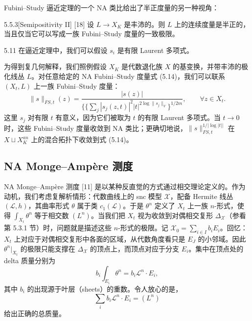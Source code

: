 Fubini--Study 逼近定理的一个 NA 类比给出了半正度量的另一种视角：

\begin{proposition}{5.5.3}[Semipositivity II]
[18] 设 $L\to X_K$ 是丰沛的。则 $L$ 上的连续度量是半正的，当且仅当它可以写成一族 Fubini--Study 度量的一致极限。
\end{proposition}

\begin{remark}{5.11}
在逼近定理中，我们可以假设 $s_i$ 是有限 Laurent 多项式。
\end{remark}


为得到复几何解释，我们照例假设 $X_K$ 是代数退化族 $X$ 的基变换，并带丰沛的极化线丛 $L$。对任意给定的 NA Fubini--Study 度量式 (5.14)，我们可以联系 $(X_t,L)$ 上一族 Fubini--Study 度量：
\begin{equation}
\|s\|_{FS,t}(z)=\frac{|s(z)|}{\Big\{\Big\{\sum_j|s_j(z,t)|^2|t|^{2\log\|s_j\|_V}\Big\}^{1/2m}},\qquad \forall z\in X_t. \tag{5.15}
\end{equation}
这里 $s_j$ 对有限 $t$ 有意义，因为它们被取为 $t$ 的有限 Laurent 多项式。当 $t\to 0$ 时，这些 Fubini--Study 度量收敛到 NA 类比；更确切地说，$\|s\|_{FS,t}^{1/|\log|t||}$ 在 $X\sqcup X_K^{an}$ 上的混合拓扑下收敛到式 (5.14)。


\subsection{NA Monge--Ampère 测度}
NA Monge--Ampère 测度 [11] 是以某种反直觉的方式通过相交理论定义的。作为动机，我们考虑复解析情形：代数曲线上的 snc 模型 $\mathcal X$，配备 Hermite 线丛 $(\mathcal L,h)$，其曲率形式 $\theta$ 属于类 $c_1(\mathcal L)$。于是 $\theta^n$ 定义了 $X_t$ 上一族 $n$-形式，使得 $\int_{X_t}\theta^n$ 等于相交数 $(L^n)$。当我们把 $X_t$ 视为收敛到对偶相交复形 $\Delta_{\mathcal X}$（参看第 5.3.1 节）时，问题就是描述这些 $n$-形式的极限。记 $\mathcal X_0=\sum_{i\in I}b_iE_i$。回忆：$X_t$ 上对应于对偶相交复形中各面的区域，从代数角度看只是 $E_J$ 的小邻域。因此 $\theta^n|_{X_t}$ 的极限只能支撑在 $\Delta_{\mathcal X}$ 的顶点上，而顶点对应于分支 $E_i$。集中在顶点处的 delta 质量分别为
\[
b_i\int_{E_i}\theta^n=b_i\mathcal L^n\cdot E_i,
\]
其中 $b_i$ 的出现源于叶层（sheets）的重数。令人放心的是，
\[
\sum_i b_i\mathcal L^n\cdot E_i=(L^n)
\]
给出正确的总质量。

